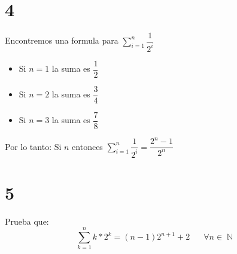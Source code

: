 \documentclass[12pt, fleqn]{article}                            %
\DeclareMathOperator \Space     {\quad}                         %
\theoremstyle{break}                                            %
\DeclareMathOperator \Naturals     {\mathbb{N}}                 %
\begin{document}
\section{4}

    Encontremos una formula para $\sum_{i=1}^n \dfrac{1}{2^i}$
    \begin{itemize}
        \item Si $n = 1$ la suma es $\dfrac{1}{2}$
        \item Si $n = 2$ la suma es $\dfrac{3}{4}$
        \item Si $n = 3$ la suma es $\dfrac{7}{8}$
    \end{itemize}

    Por lo tanto:
    Si $n$ entonces $\sum_{i=1}^n \dfrac{1}{2^i} = \dfrac{2^n - 1}{2^n}$



\clearpage
\section{5}

    Prueba que:
    \begin{equation*}
        \sum_{k=1}^n k * 2^k = (n-1)2^{n+1} + 2
        \Space \forall n \in \Naturals 
    \end{equation*}
\end{document}
